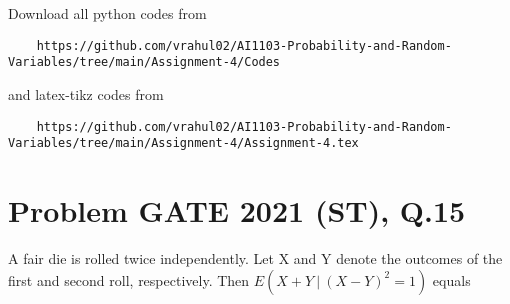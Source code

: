 \documentclass[journal,12pt,twocolumn]{IEEEtran}
\begin{document}
Download all python codes from 
\begin{lstlisting}
    https://github.com/vrahul02/AI1103-Probability-and-Random-Variables/tree/main/Assignment-4/Codes
\end{lstlisting}
%
and latex-tikz codes from 
%
\begin{lstlisting}
    https://github.com/vrahul02/AI1103-Probability-and-Random-Variables/tree/main/Assignment-4/Assignment-4.tex
\end{lstlisting}


\section*{Problem GATE 2021 (ST), Q.15}
A fair die is rolled twice independently. Let X and Y denote the outcomes of the first and second roll, respectively. Then $E(X+Y\:|\:(X-Y)^2=1)$ equals
\end{document}
